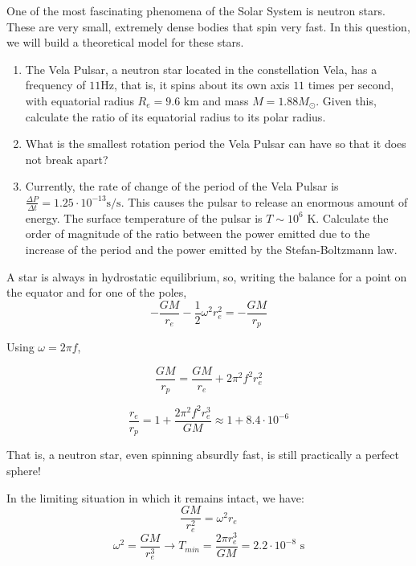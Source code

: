 \documentclass[11pt]{article}
\begin{document}
\begin{pproblem} One of the most fascinating phenomena of the Solar System is neutron stars. These are very small, extremely dense bodies that spin very fast. In this question, we will build a theoretical model for these stars.
    \begin{enumerate}[label=\textbf{\alph*)}]
        \item The Vela Pulsar, a neutron star located in the constellation Vela, has a frequency of \(11 \text{Hz}\), that is, it spins about its own axis \(11\) times per second, with equatorial radius \(R_e = 9.6\text{ km}\) and mass \(M = 1.88M_\odot\). Given this, calculate the ratio of its equatorial radius to its polar radius.
        \item What is the smallest rotation period the Vela Pulsar can have so that it does not break apart?
        \item Currently, the rate of change of the period of the Vela Pulsar is \(\frac{\Delta P}{\Delta t} = 1.25 \cdot 10^{-13}\text{s/s}\). This causes the pulsar to release an enormous amount of energy. The surface temperature of the pulsar is \(T \sim 10^6\text{ K}\). Calculate the order of magnitude of the ratio between the power emitted due to the increase of the period and the power emitted by the Stefan-Boltzmann law.
    \end{enumerate}
    \begin{pssolution*}{}{}
        \begin{alternativas}
            \item A star is always in hydrostatic equilibrium, so, writing the balance for a point on the equator and for one of the poles,
            \[-\frac{GM}{r_e}-\frac{1}{2}\omega^2r_e^2 = -\frac{GM}{r_p}\]

            Using \(\omega = 2\pi f\),

            \[\frac{GM}{r_p} = \frac{GM}{r_e}+2\pi^2f^2r_e^2\]

            \[\boxed{\frac{r_e}{r_p} = 1+\frac{2\pi^2f^2r_e^3}{GM} \approx 1 + 8.4\cdot10^{-6}}\]

            That is, a neutron star, even spinning absurdly fast, is still practically a perfect sphere!

            \item In the limiting situation in which it remains intact, we have:
            \[\frac{GM}{r_e^2} = \omega^2r_e\]
            \[\omega^2 = \frac{GM}{r_e^3} \rightarrow \boxed{T_{min} = \frac{2\pi r_e^3}{GM} = 2.2\cdot10^{-8}\text{ s}}\]


\end{alternativas}
\end{pssolution*}
\end{pproblem}
\end{document}
